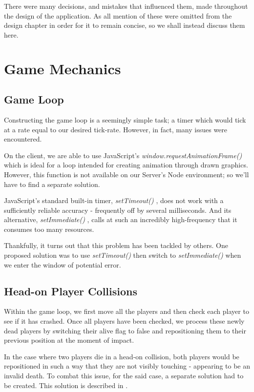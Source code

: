 \documentclass{standalone}
\begin{document}
	There were many decisions, and mistakes that influenced them, made throughout the design of the application. As all mention of these were omitted from the design chapter  in order for it to remain concise, so we shall instead discuss them here.

	\section{Game Mechanics}
		\subsection{Game Loop}
			Constructing the game loop is a seemingly simple task; a timer which would tick at a rate equal to our desired tick-rate. However, in fact, many issues were encountered.

			On the client, we are able to use JavaScript's \emph{window.requestAnimationFrame()} \parencite{JsRequestAnimationFrame} which is ideal for a loop intended for creating animation through drawn graphics. However, this function is not available on our Server's Node environment; so we'll have to find a separate solution.

			JavaScript's standard built-in timer, \emph{setTimeout()} \parencite{JsSetTimeout}, does not work with a sufficiently reliable accuracy - frequently off by several milliseconds. And its alternative, \emph{setImmediate()} \parencite{JsSetImmediate}, calls at such an incredibly high-frequency that it consumes too many resources.

			Thankfully, it turns out that this problem has been tackled by others. One proposed solution \parencite{JsGameLoop} was to use \emph{setTimeout()} then switch to \emph{setImmediate()} when we enter the window of potential error.

		\subsection{Head-on Player Collisions}
			Within the game loop, we first move all the players and then check each player to see if it has crashed. Once all players have been checked, we process these newly dead players by switching their alive flag to false and repositioning them to their previous position at the moment of impact.

			In the case where two players die in a head-on collision, both players would be repositioned in such a way that they are not visibly touching - appearing to be an invalid death. To combat this issue, for the said case, a separate solution had to be created. This solution is described in .
\end{document}
